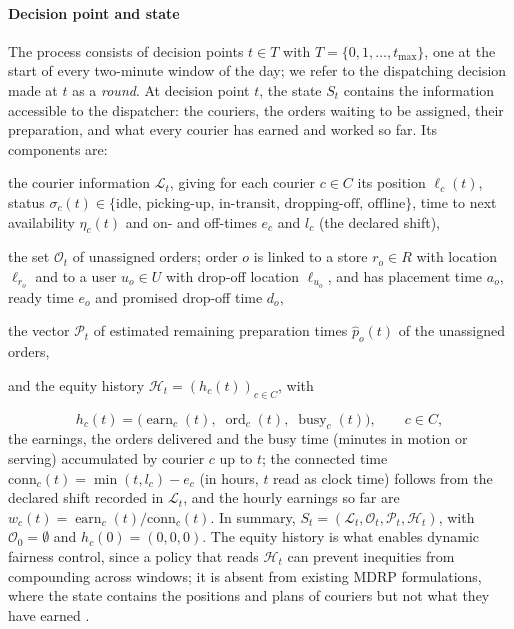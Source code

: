 \documentclass[a4paper,11pt,review,3p,authoryear]{elsarticle}
\newcommand{\Hist}{\mathcal{H}}
\newcommand{\conn}{\mathrm{conn}}
\DeclareMathOperator{\earn}{earn}
\DeclareMathOperator{\busy}{busy}
\DeclareMathOperator{\ord}{ord}
\begin{document}
\paragraph{Decision point and state}

The process consists of decision points $t \in T$ with $T = \{0, 1, \dots, t_{\max}\}$, one at the start of every two-minute window of the day; we refer to the dispatching decision made at $t$ as a \emph{round}. At decision point $t$, the state $S_t$ contains the information accessible to the dispatcher: the couriers, the orders waiting to be assigned, their preparation, and what every courier has earned and worked so far. Its components are:

\begin{compactitem}
    \item the courier information $\mathcal{L}_t$, giving for each courier $c \in C$ its position $\ell_c(t)$, status $\sigma_c(t) \in \{\text{idle, picking-up, in-transit, dropping-off, offline}\}$, time to next availability $\eta_c(t)$ and on- and off-times $e_c$ and $l_c$ (the declared shift),
    \item the set $\mathcal{O}_t$ of unassigned orders; order $o$ is linked to a store $r_o \in R$ with location $\ell_{r_o}$ and to a user $u_o \in U$ with drop-off location $\ell_{u_o}$, and has placement time $a_o$, ready time $e_o$ and promised drop-off time $d_o$,
    \item the vector $\mathcal{P}_t$ of estimated remaining preparation times $\hat p_o(t)$ of the unassigned orders,
    \item and the equity history $\Hist_t = (h_c(t))_{c \in C}$, with
\end{compactitem}
\begin{equation}
h_c(t) = \bigl(\earn_c(t),\; \ord_c(t),\; \busy_c(t)\bigr), \qquad c \in C,
\label{eqn:history}
\end{equation}
the earnings, the orders delivered and the busy time (minutes in motion or serving) accumulated by courier $c$ up to $t$; the connected time $\conn_c(t) = \min(t, l_c) - e_c$ (in hours, $t$ read as clock time) follows from the declared shift recorded in $\mathcal{L}_t$, and the hourly earnings so far are $w_c(t) = \earn_c(t)/\conn_c(t)$. In summary, $S_t = (\mathcal{L}_t, \mathcal{O}_t, \mathcal{P}_t, \Hist_t)$, with $\mathcal{O}_0 = \emptyset$ and $h_c(0) = (0, 0, 0)$. The equity history is what enables dynamic fairness control, since a policy that reads $\Hist_t$ can prevent inequities from compounding across windows; it is absent from existing MDRP formulations, where the state contains the positions and plans of couriers but not what they have earned \citep{ulmer2020modeling}.
\end{document}
